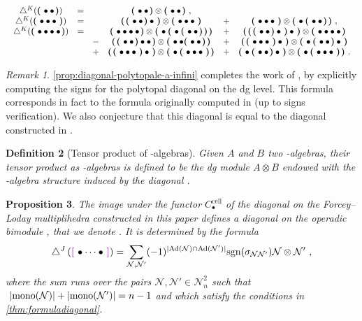 \documentclass[10pt]{amsart}
\newtheorem{definition}{Definition}[section]
\newtheorem{proposition}[definition]{Proposition}
\theoremstyle{remark}
\newtheorem{remark}[definition]{\sc Remark}
\begin{document}
\[ \resizebox{\hsize}{!}{$\displaystyle{
\begin{matrix}
\diagainf ( \black { \bullet \bullet } )
&=& & \black{\bullet \bullet} \otimes \black{\bullet \bullet} \ , & & \\
\diagainf ( \black { \bullet \bullet \bullet } ) 
&=& & \black{\black{\bullet \bullet} \bullet} \otimes \black{\bullet \bullet \bullet} &+& \black{\bullet \bullet \bullet} \otimes \black{ \bullet \black{\bullet \bullet}} \ , \\
\diagainf ( \black{ \bullet \bullet \bullet \bullet} ) 
&=& & 
\black{\bullet \bullet \bullet \bullet} \otimes \black{\bullet \black{ \bullet \black{ \bullet \bullet }} }  
&+& \black{ \black{ \black{\bullet \bullet} \bullet } \bullet }  \otimes \black{ \bullet \bullet \bullet \bullet } \\
& & -& \black{ \black{\bullet \bullet } \bullet \bullet } \otimes \black{ \bullet \bullet \black{ \bullet \bullet }}  &+& \black{ \black{ \bullet \bullet \bullet } \bullet }  \otimes \black{ \bullet \black{ \bullet \bullet } \bullet }  \\ 
& & +& \black{ \black{ \bullet \bullet \bullet } \bullet }  \otimes \black{ \bullet \black{ \bullet \bullet \bullet }} &+& \black{ \bullet \black{ \bullet \bullet } \bullet } \otimes \black{ \bullet \black{ \bullet \bullet \bullet }} \ .
\end{matrix}}$} \]

\begin{remark}
\cref{prop:diagonal-polytopale-a-infini} completes the work of \cite{MTTV19}, by explicitly computing the signs for the polytopal diagonal on the dg level. This formula corresponds in fact to the formula originally computed in \cite{MarklShnider06} (up to signs verification). We also conjecture that this diagonal is equal to the diagonal constructed in \cite{SaneblidzeUmble04}.
\end{remark}

\begin{definition}[Tensor product of \Ainf -algebras] \label{def:tensor-product-ainf-alg}
Given $A$ and $B$ two \Ainf -algebras, their tensor product as \Ainf -algebras is defined to be the dg module $A \otimes B$ endowed with the \Ainf -algebra structure induced by the diagonal \diagainf .
\end{definition}

\begin{proposition}
\label{prop:diagonal-polytopale-m-infini}
The image under the functor $C_\bullet^{\mathrm{cell}}$ of the diagonal on the Forcey--Loday multiplihedra constructed in this paper defines a diagonal on the operadic bimodule \Minf , that we denote \diagminf . It is determined by the formula
\[ \diagminf \left( \purple{\bullet \cdots \bullet} \right) = 
\sum_{
\mathcal{N},\mathcal{N}'} 
(-1)^{|\mathrm{Ad}(\mathcal{N})\cap \mathrm{Ad}(\mathcal{N}')|}
\mathrm{sgn}(\sigma_{\mathcal{N}\mathcal{N}'})
\mathcal{N} \otimes \mathcal{N}' \ ,\]
where the sum runs over the pairs $\mathcal{N},\mathcal{N}' \in \mathcal{N}^2_n$ such that $\ |\mono(\mathcal{N})|+|\mono(\mathcal{N}')|=n-1$ and which satisfy the conditions in \cref{thm:formuladiagonal}.
\end{proposition}
\end{document}
